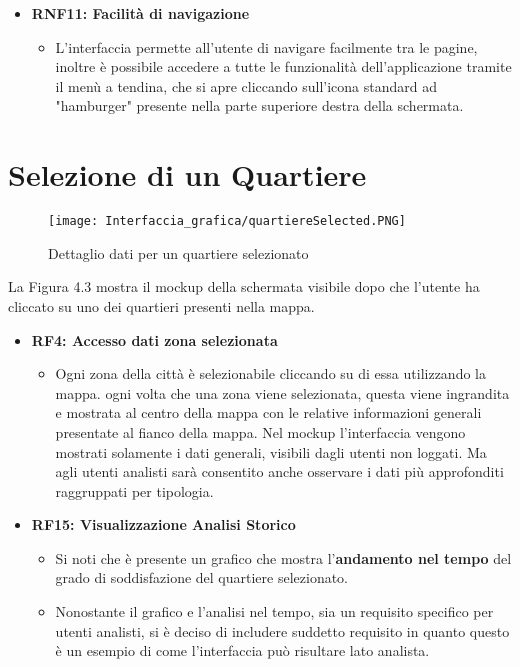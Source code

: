 \begin{itemize}
\begin{itemize}
        \end{itemize}
        \item \textbf{RNF11: Facilità di navigazione} \begin{itemize}
            \item L'interfaccia permette all'utente di navigare facilmente tra le pagine, inoltre è possibile accedere a tutte le funzionalità dell'applicazione tramite il menù a tendina, che si apre cliccando sull'icona standard ad "hamburger" presente nella parte superiore destra della schermata.
            \end{itemize}
    \end{itemize}
\newpage
\section{Selezione di un Quartiere}
    \begin{figure}[H]
        \center
        \texttt{[image: Interfaccia\_grafica/quartiereSelected.PNG]}
        \caption{Dettaglio dati per un quartiere selezionato}
    \end{figure}    

    La Figura 4.3 mostra il mockup della schermata visibile dopo che l'utente ha cliccato su uno dei quartieri presenti nella mappa.

    \begin{itemize}
        \item \textbf{RF4: Accesso dati zona selezionata} \begin{itemize}
            \item Ogni zona della città è selezionabile cliccando su di essa utilizzando la mappa. ogni volta che una zona viene selezionata, questa viene ingrandita e mostrata al centro della mappa con le relative informazioni generali  presentate al fianco della mappa. Nel mockup l'interfaccia vengono mostrati solamente i dati generali, visibili dagli utenti non loggati. Ma agli utenti analisti sarà consentito anche osservare i dati più approfonditi raggruppati per tipologia.
        \end{itemize} 
        \item \textbf{RF15: Visualizzazione Analisi Storico} \begin{itemize}
            \item Si noti che è presente un grafico che mostra l'\textbf{andamento nel tempo} del grado di soddisfazione del quartiere selezionato.
            \item Nonostante il grafico e l'analisi nel tempo, sia un requisito specifico per utenti analisti, si è deciso di includere suddetto requisito in quanto questo è un esempio di come l'interfaccia può risultare lato analista.
        \end{itemize}
    \end{itemize}
